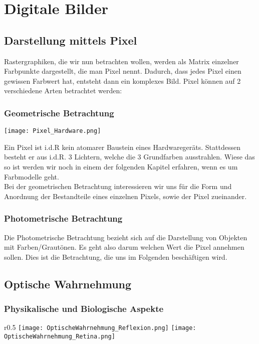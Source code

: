 \section{Digitale Bilder}

\subsection{Darstellung mittels Pixel}
\label{sec:pixel}
Rastergraphiken, die wir nun betrachten wollen, werden als Matrix einzelner Farbpunkte dargestellt, die man Pixel nennt. Dadurch, dass jedes Pixel einen gewissen Farbwert hat, entsteht dann ein komplexes Bild. Pixel können auf 2 verschiedene Arten betrachtet werden:

\subsubsection*{Geometrische Betrachtung}

\texttt{[image: Pixel\_Hardware.png]}

Ein Pixel ist i.d.R kein atomarer Baustein eines Hardwaregeräts. Stattdessen besteht er aus i.d.R. 3 Lichtern, welche die 3 Grundfarben ausstrahlen. Wiese das so ist werden wir noch in einem der folgenden Kapitel erfahren, wenn es um Farbmodelle geht.\\
Bei der geometrischen Betrachtung interessieren wir uns für die Form und Anordnung der Bestandteile eines einzelnen Pixels, sowie der Pixel zueinander.

\subsubsection*{Photometrische Betrachtung}
Die Photometrische Betrachtung bezieht sich auf die Darstellung von Objekten mit Farben/Grautönen. Es geht also darum welchen Wert die Pixel annehmen sollen. Dies ist die Betrachtung, die uns im Folgenden beschäftigen wird.

\subsection{Optische Wahrnehmung}
\subsubsection*{Physikalische und Biologische Aspekte}

\begin{wrapfigure}{r}{0.5\textwidth}
    \centering
    \texttt{[image: OptischeWahrnehmung\_Reflexion.png]}
    \texttt{[image: OptischeWahrnehmung\_Retina.png]}
\end{wrapfigure}

